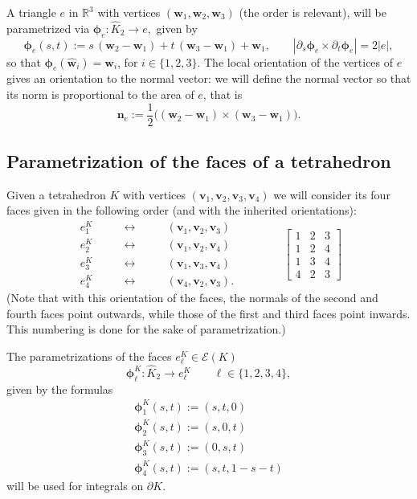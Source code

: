 \documentclass[10pt,english]{article}
\newcommand{\smallfrac}[2]{{\textstyle\frac{#1}{#2}}}
\newcommand{\ds}{\displaystyle}
\begin{document}
A triangle $e$ in $\mathbb R^3$ with vertices $(\mathbf w_1, \mathbf w_2, \mathbf w_3)$ (the order is relevant), will be parametrized via
$\boldsymbol\phi_e:\widehat K_2\to e,$
given by
\[
\boldsymbol\phi_e(s,t):=s\,(\mathbf w_2-\mathbf w_1)+t\,(\mathbf w_3-\mathbf w_1)+\mathbf w_1, \qquad |\partial_s\boldsymbol\phi_e\times \partial_t\boldsymbol\phi_e|=2|e|,
\]
so that $\boldsymbol\phi_e(\widehat{\mathbf w}_i)=\mathbf w_i$, for $i\in \{1,2,3\}$.
The local orientation of the vertices of $e$ gives an orientation to the normal vector: we will define the normal vector so that its norm is proportional to the area of $e$, that is
\[
\mathbf n_e:=\smallfrac12 \Big( (\mathbf w_2-\mathbf w_1)\times (\mathbf w_3-\mathbf w_1)\Big).
\]


\subsection{Parametrization of the faces of a tetrahedron}\label{sec:1.3}

Given a tetrahedron $K$ with vertices $(\mathbf v_1,\mathbf v_2,\mathbf v_3,\mathbf v_4)$ we will consider its four faces given in the following order (and with the inherited orientations):
\[
\begin{array}{ccc}
e^K_1 &\qquad \longleftrightarrow \qquad& (\mathbf v_1,\mathbf v_2,\mathbf v_3)\\[1.3ex]
e^K_2  &\qquad \longleftrightarrow \qquad& (\mathbf v_1,\mathbf v_2,\mathbf v_4)\\[1.3ex]
e^K_3  &\qquad \longleftrightarrow \qquad& (\mathbf v_1,\mathbf v_3,\mathbf v_4)\\[1.3ex]
e^K_4  &\qquad \longleftrightarrow \qquad& (\mathbf v_4,\mathbf v_2,\mathbf v_3).
\end{array}\qquad\qquad \left[\begin{array}{ccc} 1 & 2 & 3 \\[1.3ex] 1 & 2 & 4 \\[1.3ex]1 & 3 & 4 \\[1.3ex]4 & 2 & 3\end{array}\right]
\]
(Note that with this orientation of the faces, the normals of the second and fourth faces point outwards, while those of the first and third faces point inwards. This numbering is done for the sake of parametrization.)

The parametrizations of the faces $ e_\ell^K\in \mathcal E(K)$
\[
\boldsymbol\phi_\ell^K:\widehat K_2\to e_\ell^K \qquad \ell\in \{1,2,3,4\},
\]
given by the formulas
\[
\begin{array}{l}\ds \boldsymbol\phi_1^K(s,t) := (s,t,0)\\[1.5ex] 
\ds \boldsymbol\phi_2^K(s,t) :=(s,0,t)\\[1.5ex] 
\ds \boldsymbol\phi_3^K(s,t) :=(0,s,t) \\[1.5ex] 
\ds \boldsymbol\phi_4^K(s,t) :=(s,t,1-s-t)\end{array}
\]
will be used for integrals on $\partial K$.
\end{document}
